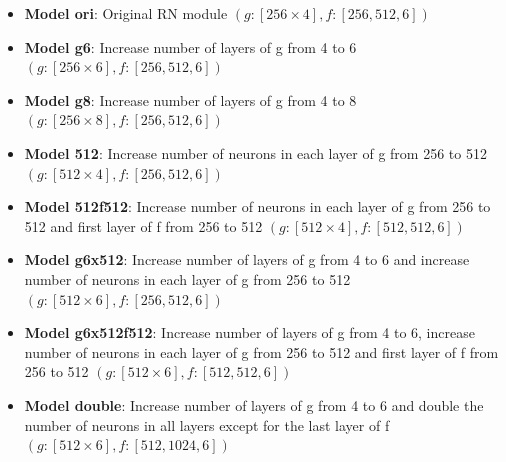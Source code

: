 \documentclass{article}
\begin{document}
\begin{itemize}

\item \textbf{Model ori}: Original RN module $(g: [256 \times 4], f: [256,512,6])$

\item \textbf{Model g6}: Increase number of layers of g from 4 to 6 $(g: [256 \times 6], f: [256,512,6])$

\item \textbf{Model g8}: Increase number of layers of g from 4 to 8 $(g: [256 \times 8], f: [256,512,6])$

\item \textbf{Model 512}: Increase number of neurons in each layer of g from 256 to 512 $(g: [512 \times 4], f: [256,512,6])$

\item \textbf{Model 512f512}: Increase number of neurons in each layer of g from 256 to 512 and first layer of f from 256 to 512 $(g: [512 \times 4], f: [512,512,6])$

\item \textbf{Model g6x512}: Increase number of layers of g from 4 to 6 and increase number of neurons in each layer of g from 256 to 512 $(g: [512 \times 6], f: [256,512,6])$

\item \textbf{Model g6x512f512}: Increase number of layers of g from 4 to 6, increase number of neurons in each layer of g from 256 to 512 and first layer of f from 256 to 512 $(g: [512 \times 6], f: [512,512,6])$

\item \textbf{Model double}: Increase number of layers of g from 4 to 6 and double the number of neurons in all layers except for the last layer of f $(g: [512 \times 6], f: [512,1024,6])$

\end{itemize}
\end{document}

